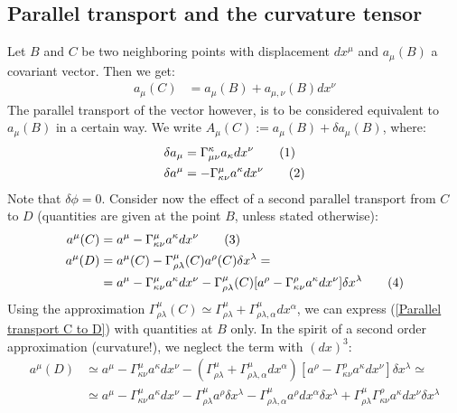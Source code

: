 \documentclass[a4paper,12pt]{article}
\newcommand\numberthis{\addtocounter{equation}{1}\tag{\theequation}}
\begin{document}
\subsection{Parallel transport and the curvature tensor}
Let $B$ and $C$ be two neighboring points with displacement $dx^\mu$ and $a_\mu(B)$ a covariant vector. Then we get:
\begin{align*}
a_\mu(C)&=a_\mu(B)+a_{\mu,\nu}(B)dx^\nu
\end{align*}
The parallel transport of the vector however, is to be considered equivalent to $a_\mu(B)$ in a certain way. We write $A_\mu(C):=a_\mu(B)+\delta a_\mu(B)$, where:
\begin{align*}
\delta a_\mu &=\Gamma^\kappa_{\mu\nu}a_\kappa dx^\nu\numberthis\label{Parallel transport of covariant vector}\\
\delta a^\mu &=-\Gamma^\mu_{\kappa\nu}a^\kappa dx^\nu\numberthis\label{Parallel transport of contravariant vector}
\end{align*}
Note that $\delta\phi=0$. Consider now the effect of a second parallel transport from $C$ to $D$ (quantities are given at the point $B$, unless stated otherwise):
\begin{align*}
a^\mu(C)&=a^\mu-\Gamma^\mu_{\kappa\nu}a^\kappa dx^\nu\numberthis\label{Parallel transport B to C}\\
a^\mu(D)&=a^\mu(C)-\Gamma^\mu_{\rho\lambda}(C)a^\rho(C)\delta x^\lambda=\\
&=a^\mu-\Gamma^\mu_{\kappa\nu}a^\kappa dx^\nu-\Gamma^\mu_{\rho\lambda}(C)[a^\rho -\Gamma^\rho_{\kappa\nu}a^\kappa dx^\nu ]\delta x^\lambda\numberthis\label{Parallel transport C to D}
\end{align*}
Using the approximation $\Gamma^\mu_{\rho\lambda}(C)\simeq \Gamma^\mu_{\rho\lambda}+\Gamma^\mu_{\rho\lambda,\alpha}dx^\alpha$, we can express (\ref{Parallel transport C to D}) with quantities at $B$ only. In the spirit of a second order approximation (curvature!), we neglect the term with $(dx)^3$:
\begin{align*}
a^\mu(D)&\simeq a^\mu-\Gamma^\mu_{\kappa\nu}a^\kappa dx^\nu-(\Gamma^\mu_{\rho\lambda}+\Gamma^\mu_{\rho\lambda,\alpha}dx^\alpha)[a^\rho -\Gamma^\rho_{\kappa\nu}a^\kappa dx^\nu ]\delta x^\lambda\simeq\\
&\simeq a^\mu-\Gamma^\mu_{\kappa\nu}a^\kappa dx^\nu-\Gamma^\mu_{\rho\lambda}a^\rho\delta x^\lambda-\Gamma^\mu_{\rho\lambda,\alpha}a^\rho dx^\alpha\delta x^\lambda +\Gamma^\mu_{\rho\lambda}\Gamma^\rho_{\kappa\nu}a^\kappa dx^\nu\delta x^\lambda
\end{align*}
\end{document}
